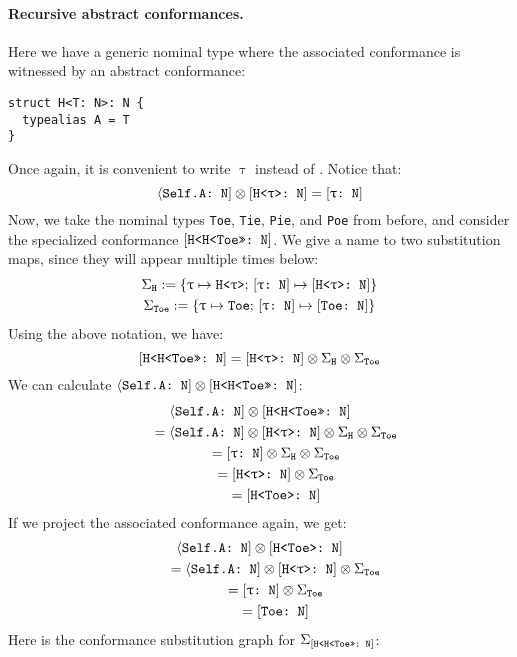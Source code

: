 \documentclass[../generics]{subfiles}
\begin{document}
\paragraph{Recursive abstract conformances.}
Here we have a generic nominal type where the associated conformance is witnessed by an abstract conformance:
\begin{Verbatim}
struct H<T: N>: N {
  typealias A = T
}
\end{Verbatim}
Once again, it is convenient to write $\uptau$ instead of \rT. Notice that:
\[\langle\texttt{Self.A:~N}] \otimes [\texttt{H<$\uptau$>:~N}] = [\texttt{$\uptau$:~N}]\]
Now, we take the nominal types \texttt{Toe}, \texttt{Tie}, \texttt{Pie}, and \texttt{Poe} from before, and consider the specialized conformance $[\texttt{H<H<Toe>>:~N}]$. We give a name to two substitution maps, since they will appear multiple times below:
\begin{gather*}
\Sigma_\texttt{H} := \{\texttt{$\uptau$} \mapsto \texttt{H<$\uptau$>};\,[\texttt{$\uptau$:~N}] \mapsto [\texttt{H<$\uptau$>:~N}]\}\\
\Sigma_\texttt{Toe} := \{\texttt{$\uptau$} \mapsto \texttt{Toe};\,[\texttt{$\uptau$:~N}] \mapsto [\texttt{Toe:~N}]\}
\end{gather*}
Using the above notation, we have:
\[[\texttt{H<H<Toe>>:~N}] = [\texttt{H<$\uptau$>:~N}]\otimes \Sigma_{\texttt{H}}\otimes \Sigma_{\texttt{Toe}}\]
We can calculate $\langle\texttt{Self.A:~N}]\otimes[\texttt{H<H<Toe>>:~N}]$:
\begin{gather*}
\langle\texttt{Self.A:~N}] \otimes [\texttt{H<H<Toe>>:~N}]\\
\qquad {} = \langle\texttt{Self.A:~N}] \otimes [\texttt{H<$\uptau$>:~N}] \otimes \Sigma_{\texttt{H}}\otimes \Sigma_{\texttt{Toe}} \\
\qquad {} = [\texttt{$\uptau$:~N}] \otimes \Sigma_{\texttt{H}}\otimes \Sigma_{\texttt{Toe}} \\
\qquad {} = [\texttt{H<$\uptau$>:~N}] \otimes \Sigma_{\texttt{Toe}}\\
\qquad {} = [\texttt{H<Toe>:~N}]
\end{gather*}
If we project the associated conformance again, we get:
\begin{gather*}
\langle\texttt{Self.A:~N}] \otimes [\texttt{H<Toe>:~N}]\\
\qquad {} = \langle\texttt{Self.A:~N}] \otimes [\texttt{H<$\uptau$>:~N}] \otimes \Sigma_{\texttt{Toe}}\\
\qquad {} = [\texttt{$\uptau$:~N}] \otimes \Sigma_{\texttt{Toe}}\\
\qquad {} = [\texttt{Toe:~N}]
\end{gather*}
Here is the conformance substitution graph for $\Sigma_{[\texttt{H<H<Toe>>:~N}]}$:

\smallskip
\end{document}
